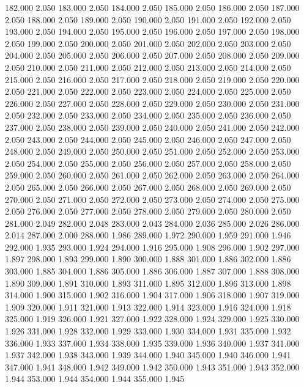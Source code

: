 182.000 2.050 
183.000 2.050 
184.000 2.050 
185.000 2.050 
186.000 2.050 
187.000 2.050 
188.000 2.050 
189.000 2.050 
190.000 2.050 
191.000 2.050 
192.000 2.050 
193.000 2.050 
194.000 2.050 
195.000 2.050 
196.000 2.050 
197.000 2.050 
198.000 2.050 
199.000 2.050 
200.000 2.050 
201.000 2.050 
202.000 2.050 
203.000 2.050 
204.000 2.050 
205.000 2.050 
206.000 2.050 
207.000 2.050 
208.000 2.050 
209.000 2.050 
210.000 2.050 
211.000 2.050 
212.000 2.050 
213.000 2.050 
214.000 2.050 
215.000 2.050 
216.000 2.050 
217.000 2.050 
218.000 2.050 
219.000 2.050 
220.000 2.050 
221.000 2.050 
222.000 2.050 
223.000 2.050 
224.000 2.050 
225.000 2.050 
226.000 2.050 
227.000 2.050 
228.000 2.050 
229.000 2.050 
230.000 2.050 
231.000 2.050 
232.000 2.050 
233.000 2.050 
234.000 2.050 
235.000 2.050 
236.000 2.050 
237.000 2.050 
238.000 2.050 
239.000 2.050 
240.000 2.050 
241.000 2.050 
242.000 2.050 
243.000 2.050 
244.000 2.050 
245.000 2.050 
246.000 2.050 
247.000 2.050 
248.000 2.050 
249.000 2.050 
250.000 2.050 
251.000 2.050 
252.000 2.050 
253.000 2.050 
254.000 2.050 
255.000 2.050 
256.000 2.050 
257.000 2.050 
258.000 2.050 
259.000 2.050 
260.000 2.050 
261.000 2.050 
262.000 2.050 
263.000 2.050 
264.000 2.050 
265.000 2.050 
266.000 2.050 
267.000 2.050 
268.000 2.050 
269.000 2.050 
270.000 2.050 
271.000 2.050 
272.000 2.050 
273.000 2.050 
274.000 2.050 
275.000 2.050 
276.000 2.050 
277.000 2.050 
278.000 2.050 
279.000 2.050 
280.000 2.050 
281.000 2.049 
282.000 2.048 
283.000 2.043 
284.000 2.036 
285.000 2.026 
286.000 2.014 
287.000 2.000 
288.000 1.986 
289.000 1.972 
290.000 1.959 
291.000 1.946 
292.000 1.935 
293.000 1.924 
294.000 1.916 
295.000 1.908 
296.000 1.902 
297.000 1.897 
298.000 1.893 
299.000 1.890 
300.000 1.888 
301.000 1.886 
302.000 1.886 
303.000 1.885 
304.000 1.886 
305.000 1.886 
306.000 1.887 
307.000 1.888 
308.000 1.890 
309.000 1.891 
310.000 1.893 
311.000 1.895 
312.000 1.896 
313.000 1.898 
314.000 1.900 
315.000 1.902 
316.000 1.904 
317.000 1.906 
318.000 1.907 
319.000 1.909 
320.000 1.911 
321.000 1.913 
322.000 1.914 
323.000 1.916 
324.000 1.918 
325.000 1.919 
326.000 1.921 
327.000 1.922 
328.000 1.924 
329.000 1.925 
330.000 1.926 
331.000 1.928 
332.000 1.929 
333.000 1.930 
334.000 1.931 
335.000 1.932 
336.000 1.933 
337.000 1.934 
338.000 1.935 
339.000 1.936 
340.000 1.937 
341.000 1.937 
342.000 1.938 
343.000 1.939 
344.000 1.940 
345.000 1.940 
346.000 1.941 
347.000 1.941 
348.000 1.942 
349.000 1.942 
350.000 1.943 
351.000 1.943 
352.000 1.944 
353.000 1.944 
354.000 1.944 
355.000 1.945 
